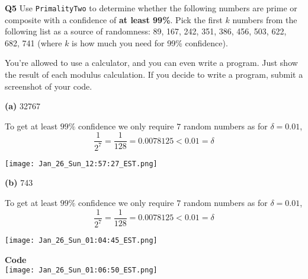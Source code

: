\documentclass[12pt]{article}
\newcommand{\question}[3][Q]{
\begin{description}
\item \textbf{#1{#2}} #3
\end{description}
}
\begin{document}
\newpage
\question{5}{
    Use \texttt{PrimalityTwo} to determine whether the following numbers are prime or composite with a confidence of \textbf{at least 99\%}. Pick the first $k$ numbers from the following list as a source of randomness: 89, 167, 242, 351, 386, 456, 503, 622, 682, 741 (where $k$ is how much you need for 99\% confidence). 

    You're allowed to use a calculator, and you can even write a program. Just show the result of each modulus calculation. If you decide to write a program, submit a screenshot of your code. 
}
\question[]{(a)}{
    32767 
}
\begin{answer}
    To get at least $99\%$ confidence we only require $7$ random numbers as for $\delta = 0.01$, 
    $$ \frac{1}{2^{7}} = \frac{1}{128} = 0.0078125 < 0.01 = \delta $$ 
    \begin{center}
    \texttt{[image: Jan\_26\_Sun\_12:57:27\_EST.png]}
    \end{center}
\end{answer}

\question[]{(b)}{
    743
}
\begin{answer}
    To get at least $99\%$ confidence we only require $7$ random numbers as for $\delta = 0.01$, 
    $$ \frac{1}{2^{7}} = \frac{1}{128} = 0.0078125 < 0.01 = \delta $$ 
    \begin{center}
    \texttt{[image: Jan\_26\_Sun\_01:04:45\_EST.png]}
    \end{center}

\end{answer}
\newpage
\begin{center}
    \textbf{Code}\\
    \vspace{1em}
    \texttt{[image: Jan\_26\_Sun\_01:06:50\_EST.png]}
\end{center}
\end{document}

